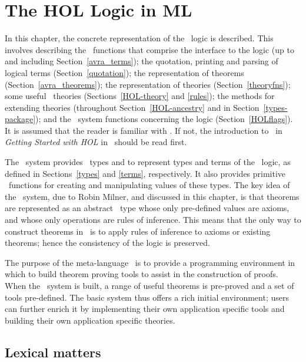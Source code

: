 \chapter{The HOL Logic in ML}\label{HOLsyschapter}

In this chapter, the concrete representation of the \HOL\ logic is
described.  This involves describing the \ML\ functions that comprise
the interface to the logic (up to and including
Section~\ref{avra_terms}); the quotation, printing and parsing of
logical terms (Section~\ref{quotation}); the representation of
theorems (Section~\ref{avra_theorems}); the representation of theories
(Section~\ref{theoryfns}); some useful \HOL\ theories
(Sections~\ref{HOL-theory} and \ref{rules}); the methods for extending
theories (throughout Section~\ref{HOL-ancestry} and in
Section~\ref{types-package}); and the \ML\ system functions
concerning the logic (Section~\ref{HOLflags}).  It is assumed that the
reader is familiar with \ML.  If not, the introduction to \ML\ in
{\sl Getting Started with HOL\/} in \TUTORIAL\ should be read first.

The \HOL\ system provides \ML\ types  and  to represent
types and terms of the \HOL\ logic, as defined in Sections~\ref{types} and
\ref{terms}, respectively. It also provides primitive \ML\ functions for
creating and manipulating values of these types.  The key idea of the \HOL\
system, due to Robin Milner, and discussed in this chapter,
is that theorems are represented as an abstract \ML\ type whose only
pre-defined values are axioms, and whose only operations are rules of
inference. This means that the only way to construct theorems in \HOL\ is
to apply rules of inference to axioms or existing theorems; hence the
consistency of the logic is preserved.

The purpose of the meta-language \ML\ is to provide a programming
environment in which to build theorem proving tools to assist in the
construction of proofs.  When the \HOL\ system is built, a range of
useful theorems is pre-proved and a set of tools pre-defined. The basic
system thus offers a rich initial environment; users can further enrich
it by implementing their own application specific tools and building
their own application specific theories.


\section{Lexical matters}
\label{HOL-lex}

